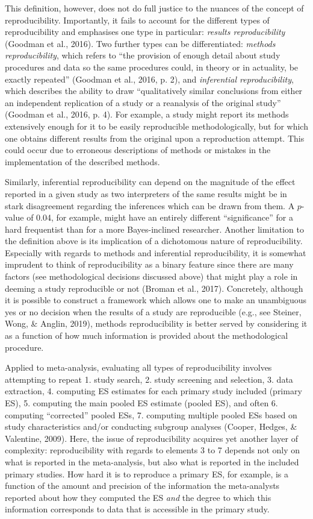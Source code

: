 \documentclass[
  man,floatsintext]{apa6}
\begin{document}
This definition, however, does not do full justice to the nuances of the concept of reproducibility. Importantly, it fails to account for the different types of reproducibility and emphasises one type in particular: \emph{results reproducibility} (Goodman et al., 2016). Two further types can be differentiated: \emph{methods reproducibility}, which refers to ``the provision of enough detail about study procedures and data so the same procedures could, in theory or in actuality, be exactly repeated'' (Goodman et al., 2016, p. 2), and \emph{inferential reproducibility}, which describes the ability to draw ``qualitatively similar conclusions from either an independent replication of a study or a reanalysis of the original study'' (Goodman et al., 2016, p. 4). For example, a study might report its methods extensively enough for it to be easily reproducible methodologically, but for which one obtains different results from the original upon a reproduction attempt. This could occur due to erroneous descriptions of methods or mistakes in the implementation of the described methods.

Similarly, inferential reproducibility can depend on the magnitude of the effect reported in a given study as two interpreters of the same results might be in stark disagreement regarding the inferences which can be drawn from them. A \(p\)-value of 0.04, for example, might have an entirely different ``significance'' for a hard frequentist than for a more Bayes-inclined researcher. Another limitation to the definition above is its implication of a dichotomous nature of reproducibility. Especially with regards to methods and inferential reproducibility, it is somewhat imprudent to think of reproducibility as a binary feature since there are many factors (see methodological decisions discussed above) that might play a role in deeming a study reproducible or not (Broman et al., 2017). Concretely, although it is possible to construct a framework which allows one to make an unambiguous yes or no decision when the results of a study are reproducible (e.g., see Steiner, Wong, \& Anglin, 2019), methods reproducibility is better served by considering it as a function of how much information is provided about the methodological procedure.

Applied to meta-analysis, evaluating all types of reproducibility involves attempting to repeat 1. study search, 2. study screening and selection, 3. data extraction, 4. computing ES estimates for each primary study included (primary ES), 5. computing the main pooled ES estimate (pooled ES), and often 6. computing ``corrected'' pooled ESs, 7. computing multiple pooled ESs based on study characteristics and/or conducting subgroup analyses (Cooper, Hedges, \& Valentine, 2009). Here, the issue of reproducibility acquires yet another layer of complexity: reproducibility with regards to elements 3 to 7 depends not only on what is reported in the meta-analysis, but also what is reported in the included primary studies. How hard it is to reproduce a primary ES, for example, is a function of the amount and precision of the information the meta-analysts reported about how they computed the ES \emph{and} the degree to which this information corresponds to data that is accessible in the primary study.
\end{document}
